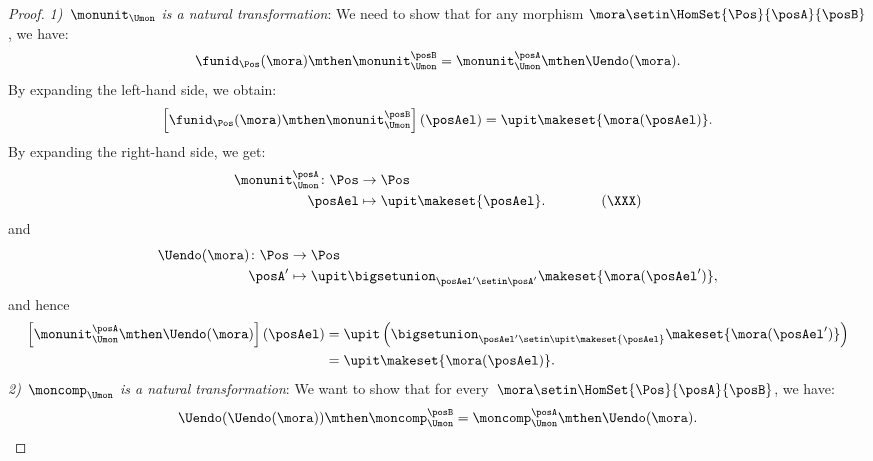 \begin{proof}
    \emph{1)~$\monunit_{\Umon}$ is a natural transformation}:
    We need to show that for any morphism $\mora\setin \HomSet{\Pos}{\posA}{\posB}$, we have:
    \begin{equation}
        \funid_{\Pos}(\mora)\mthen \monunit_{\Umon}^\posB=\monunit_{\Umon}^\posA\mthen \Uendo(\mora).
    \end{equation}
    By expanding the left-hand side, we obtain:
    \begin{equation}
        \left[\funid_{\Pos}(\mora)\mthen \monunit_{\Umon}^\posB\right](\posAel)=\upit \makeset{\mora(\posAel)}.
    \end{equation}
    By expanding the right-hand side, we get:
    \begin{equation}
        \begin{aligned}
            \monunit_{\Umon}^\posA\colon \Pos & \to \Pos \\
            \posAel                           & \mapsto \upit \makeset{\posAel}.
            \qquad \qquad (\XXX)
        \end{aligned}
    \end{equation}
    and
    \begin{equation}
        \begin{aligned}
            \Uendo(\mora)\colon \Pos & \to \Pos \\
            \posA'                   & \mapsto \upit \bigsetunion_{\posAel'\setin \posA'}\makeset{\mora(\posAel')},
        \end{aligned}
    \end{equation}
    and hence
    \begin{equation}
        \begin{aligned}
            \left[\monunit_{\Umon}^\posA\mthen \Uendo(\mora)\right](\posAel) & =\upit \left( \bigsetunion_{\posAel'\setin \upit \makeset{\posAel}} \makeset{\mora(\posAel')}\right) \\
                                                                             & =\upit \makeset{\mora(\posAel)}.
        \end{aligned}
    \end{equation}
    \emph{2)~$\moncomp_{\Umon}$ is a natural transformation}:
    We want to show that for every~$\mora\setin \HomSet{\Pos}{\posA}{\posB}$, we have:
    \begin{equation}
        \Uendo(\Uendo(\mora))\mthen \moncomp_{\Umon}^{\posB}=\moncomp_{\Umon}^\posA \mthen \Uendo(\mora).

\end{equation}
\end{proof}
